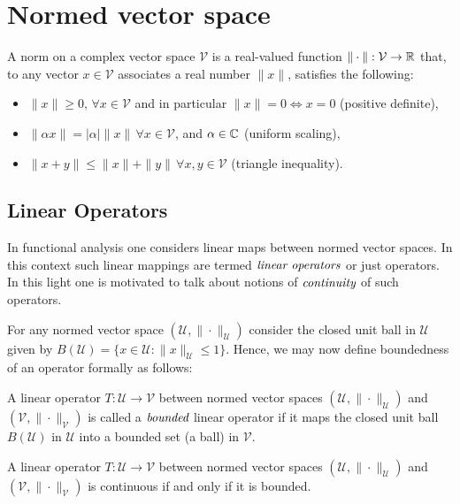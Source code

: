 
\section{Normed vector space} %
\label{sec:normedvectorspace}

A norm on a complex vector space $\mathcal{V}$ is a
real-valued function $\| \cdot \| : \mathcal{V} \to \mathbb{R}$
that, to any vector $x \in \mathcal{V}$ associates a
real number $\| x \|$, satisfies the following:
\begin{itemize}
	\item $\| x \| \geq 0, \, \forall x \in \mathcal{V}$
		and in particular $\| x \| = 0 \Leftrightarrow x=0$
		(positive definite),
	\item $\| \alpha x \| = | \alpha | \| x \| \, \forall x \in \mathcal{V}$,
		and $\alpha \in \mathbb{C}$ (uniform scaling),
	\item $\| x + y \| \leq \| x \| + \| y \| \, \forall x,y \in \mathcal{V}$ (triangle inequality).
\end{itemize}

\subsection{Linear Operators}
\label{subsec:linearoperator}

In functional analysis one considers linear maps between normed vector spaces.
In this context such linear mappings are termed $\emph{linear operators}$ or just operators.
In this light one is motivated to talk about notions of $\emph{continuity}$ of such operators.

For any normed vector space $(\mathcal{U}, \| \cdot \|_{\mathcal{U}})$ consider the closed unit ball
in $\mathcal{U}$ given by $B(\mathcal{U}) = \{ x \in \mathcal{U} : \| x \|_{\mathcal{U}} \leq 1 \}$.
Hence, we may now define boundedness of an operator formally as follows:

\begin{defn}
	A linear operator $T:\mathcal{U} \to \mathcal{V}$ between normed vector spaces
	$(\mathcal{U}, \| \cdot \|_{\mathcal{U}})$ and $(\mathcal{V}, \| \cdot \|_{\mathcal{V}})$
	is called a $\emph{bounded}$ linear operator if it maps the closed unit ball
	$B(\mathcal{U})$ in $\mathcal{U}$ into a bounded set (a ball) in $\mathcal{V}$.
\end{defn}

\begin{cor}
	A linear operator $T:\mathcal{U} \to \mathcal{V}$ between normed vector spaces
	$(\mathcal{U}, \| \cdot \|_{\mathcal{U}})$ and $(\mathcal{V}, \| \cdot \|_{\mathcal{V}})$
	is continuous if and only if it is bounded.
\end{cor}
